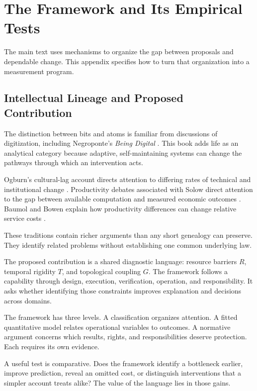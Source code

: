 \appendix
\chapter{The Framework and Its Empirical Tests}

The main text uses mechanisms to organize the gap between proposals and dependable change. This appendix specifies how to turn that organization into a measurement program.

\section{Intellectual Lineage and Proposed Contribution}

The distinction between bits and atoms is familiar from discussions of digitization, including Negroponte's \textit{Being Digital} \cite{negroponte1995being}. This book adds life as an analytical category because adaptive, self-maintaining systems can change the pathways through which an intervention acts.

Ogburn's cultural-lag account directs attention to differing rates of technical and institutional change \cite{ogburn1922social}. Productivity debates associated with Solow direct attention to the gap between available computation and measured economic outcomes \cite{solow1987watch}. Baumol and Bowen explain how productivity differences can change relative service costs \cite{baumol1966performing,baumol1967macro}.

These traditions contain richer arguments than any short genealogy can preserve. They identify related problems without establishing one common underlying law.

The proposed contribution is a shared diagnostic language: resource barriers $R$, temporal rigidity $T$, and topological coupling $G$. The framework follows a capability through design, execution, verification, operation, and responsibility. It asks whether identifying those constraints improves explanation and decisions across domains.

The framework has three levels. A classification organizes attention. A fitted quantitative model relates operational variables to outcomes. A normative argument concerns which results, rights, and responsibilities deserve protection. Each requires its own evidence.

A useful test is comparative. Does the framework identify a bottleneck earlier, improve prediction, reveal an omitted cost, or distinguish interventions that a simpler account treats alike? The value of the language lies in those gains.
